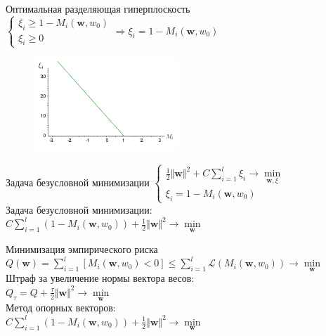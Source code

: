 \documentclass[12pt]{beamer}
\begin{document}
\begin{frame}{Оптимальная разделяющая гиперплоскость}
	$\begin{cases}
		\xi_i \geq 1 - M_i(\mathbf{w}, w_0) \\
		\xi_i \geq 0
	\end{cases} \Rightarrow \xi_i = 1 - M_i(\mathbf{w}, w_0) $\\
	\begin{figure}[htbp]
	  \includegraphics[height=100pt, keepaspectratio = true]{images/xi}   
  \end{figure}
\end{frame}

\begin{frame}{Задача безусловной минимизации}
	$\begin{cases}
		{\frac{1}{2}\Vert \mathbf{w} \Vert^2 + C \sum\limits_{i=1}^l \xi_i \rightarrow \min\limits_{\mathbf{w}, \xi}}\\
		\xi_i = 1 - M_i(\mathbf{w}, w_0)
	\end{cases}$\\
	\bigbreak
	\pause
	Задача безусловной минимизации:\\
	$ C \sum\limits_{i=1}^l (1 - M_i(\mathbf{w}, w_0)) + \frac{1}{2}\Vert \mathbf{w} \Vert^2 \rightarrow \min\limits_{\mathbf{w}}$
\end{frame}

\begin{frame}{Минимизация эмпирического риска}
	${Q(\mathbf{w}) = \sum\limits_{i=1}^l \left[ M_i(\mathbf{w}, w_0) < 0 \right] \leq\sum\limits_{i=1}^l \mathcal{L}(M_i(\mathbf{w}, w_0)) \rightarrow \min\limits_{\mathbf{w}} }$\\\vspace{3mm}
	\bigbreak
	\pause
	Штраф за увеличение нормы вектора весов:\\
	$Q_{\tau} = Q + \frac{\tau}{2}\Vert \mathbf{w} \Vert^2 \rightarrow \min\limits_{\mathbf{w}}$\\
	\bigbreak
	\pause
	Метод опорных векторов:\\
	$ C\sum\limits_{i=1}^l (1 - M_i(\mathbf{w}, w_0)) + \frac{1}{2}\Vert \mathbf{w} \Vert^2 \rightarrow \min\limits_{\mathbf{w}}$
\end{frame}
\end{document}
